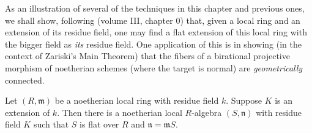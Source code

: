 As an illustration of several of the techniques in this chapter and previous
ones, we shall show, following \cite{EGA} (volume III, chapter 0) that, given a
local ring and an extension of its residue field, one may find a flat
extension of this local ring with the bigger field as \emph{its} residue
field. One application of this is in showing (in the context of Zariski's
Main Theorem) that the fibers of a birational
projective morphism of noetherian schemes (where the target is normal) are
\emph{geometrically} connected.

\begin{theorem} 
Let $(R, \mathfrak{m})$ be a noetherian local ring with residue field $k$.
Suppose $K$ is an extension of $k$. Then there is a noetherian local
$R$-algebra $(S,
\mathfrak{n})$ with residue field $K$ such that $S$ is flat over $R$ and $\mathfrak{n} =
\mathfrak{m}S$.
\end{theorem} 

